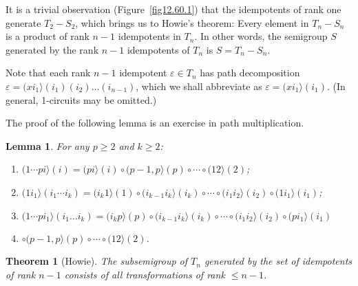 \documentclass{surv-l}
\numberwithin{equation}{section}
\numberwithin{table}{section}
\numberwithin{figure}{section}
\newtheorem{theorem}[equation]{Theorem}
\newtheorem{lemma}[equation]{Lemma}
\theoremstyle{definition}
\begin{document}
It is a trivial observation (Figure~\ref{fig12.60.1}) that the
idempotents of rank one generate $T_{2}-S_{2}$, which brings us to
Howie's theorem: Every element in $T_{n}-S_{n}$ is a product of
rank $n-1$ idempotents in $T_{n}$. In other words, the semigroup
$S$ generated by the rank $n-1$ idempotents of $T_{n}$ is
$S=T_{n}-S_{n}$.

Note that each rank $n-1$ idempotent $\varepsilon\in T_{n}$ has path
decomposition $\varepsilon=(xi_{1}\rangle(i_{1})(i_{2})\ldots
(i_{n-1})$, which we shall abbreviate as
$\varepsilon=(xi_{1}\rangle (i_{1})$. (In general, 1-circuits may
be omitted.)

The proof of the following lemma is an exercise in path
multiplication.

\setcounter{equation}{1}
\begin{lemma}\label{lem12.60.2}
\emph{For any} $p\geq 2$ \emph{and} $k\geq 2$:
\begin{enumerate}
\item[(1)]\quad $(1\cdots pi\rangle(i)=(pi\rangle(i)\circ(p-1,p\rangle(p)\circ\cdots
\circ (12\rangle (2)$;

\item[(2)]\quad $(1i_{1}\rangle(i_{1}\cdots
i_{k})=(i_{k}1\rangle(1)\circ(i_{k-1}i_{k}\rangle(i_{k})\circ\cdots\circ
(i_{1}i_{2}\rangle(i_{2})\circ(1i_{1}\rangle (i_{1})$;

\item[(3)]\quad $(1\cdots pi_{1}\rangle (i_{1}\ldots
i_{k})=(i_{k}p\rangle(p)\circ(i_{k-1}i_{k}\rangle(i_{k})\circ\cdots
\circ (i_{1}i_{2}\rangle(i_{2})\circ(pi_{1}\rangle(i_{1})$
\item[] \qquad\qquad\qquad\qquad\qquad\qquad$\circ(p-1,p\rangle(p)\circ\cdots \circ (12\rangle(2)$.
\end{enumerate}
\end{lemma}

\begin{theorem}[Howie]\label{thm12.60.3}
The subsemigroup of $T_{n}$ generated by the set of
idempotents of rank $n-1$ consists of all transformations of
rank $\leq n -1$.
\end{theorem}
\end{document}
